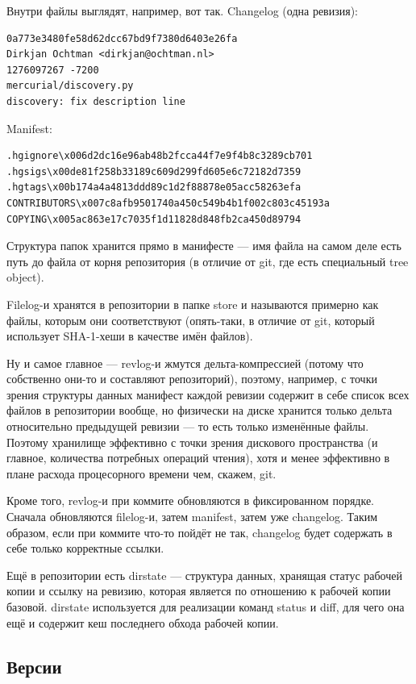 \documentclass{../../text-style}
\begin{document}
Внутри файлы выглядят, например, вот так. Changelog (одна ревизия):

\begin{verbatim}
0a773e3480fe58d62dcc67bd9f7380d6403e26fa
Dirkjan Ochtman <dirkjan@ochtman.nl>
1276097267 -7200
mercurial/discovery.py
discovery: fix description line
\end{verbatim}

Manifest:
\begin{verbatim}
.hgignore\x006d2dc16e96ab48b2fcca44f7e9f4b8c3289cb701
.hgsigs\x00de81f258b33189c609d299fd605e6c72182d7359
.hgtags\x00b174a4a4813ddd89c1d2f88878e05acc58263efa
CONTRIBUTORS\x007c8afb9501740a450c549b4b1f002c803c45193a
COPYING\x005ac863e17c7035f1d11828d848fb2ca450d89794
\end{verbatim}

Структура папок хранится прямо в манифесте --- имя файла на самом деле есть путь до файла от корня репозитория (в отличие от git, где есть специальный tree object).

Filelog-и хранятся в репозитории в папке store и называются примерно как файлы, которым они соответствуют (опять-таки, в отличие от git, который использует SHA-1-хеши в качестве имён файлов).

Ну и самое главное --- revlog-и жмутся дельта-компрессией (потому что собственно они-то и составляют репозиторий), поэтому, например, с точки зрения структуры данных манифест каждой ревизии содержит в себе список всех файлов в репозитории вообще, но физически на диске хранится только дельта относительно предыдущей ревизии --- то есть только изменённые файлы. Поэтому хранилище эффективно с точки зрения дискового пространства (и главное, количества потребных операций чтения), хотя и менее эффективно в плане расхода процесорного времени чем, скажем, git.

Кроме того, revlog-и при коммите обновляются в фиксированном порядке. Сначала обновляются filelog-и, затем manifest, затем уже changelog. Таким образом, если при коммите что-то пойдёт не так, changelog будет содержать в себе только корректные ссылки.

Ещё в репозитории есть dirstate --- структура данных, хранящая статус рабочей копии и ссылку на ревизию, которая является по отношению к рабочей копии базовой. dirstate используется для реализации команд status и diff, для чего она ещё и содержит кеш последнего обхода рабочей копии.

\subsection{Версии}
\end{document}
